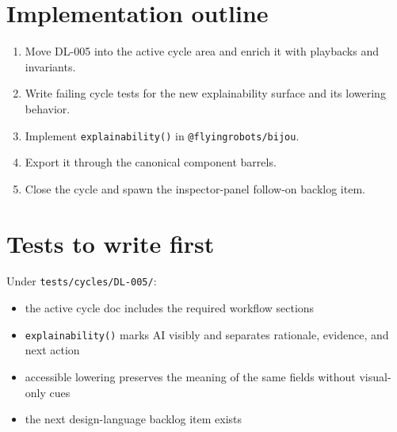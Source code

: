 \section{Implementation outline}\label{record-172-implementation-outline}

\begin{enumerate}
\def\labelenumi{\arabic{enumi}.}
\tightlist
\item
  Move DL-005 into the active cycle area and enrich it with playbacks and invariants.
\item
  Write failing cycle tests for the new explainability surface and its lowering behavior.
\item
  Implement \texttt{e\allowbreak{}x\allowbreak{}p\allowbreak{}l\allowbreak{}a\allowbreak{}i\allowbreak{}n\allowbreak{}a\allowbreak{}b\allowbreak{}i\allowbreak{}l\allowbreak{}i\allowbreak{}t\allowbreak{}y\allowbreak{}(\allowbreak{})} in \texttt{@\allowbreak{}f\allowbreak{}l\allowbreak{}y\allowbreak{}i\allowbreak{}n\allowbreak{}g\allowbreak{}r\allowbreak{}o\allowbreak{}b\allowbreak{}o\allowbreak{}t\allowbreak{}s\allowbreak{}/\allowbreak{}b\allowbreak{}i\allowbreak{}j\allowbreak{}o\allowbreak{}u}.
\item
  Export it through the canonical component barrels.
\item
  Close the cycle and spawn the inspector-panel follow-on backlog item.
\end{enumerate}

\section{Tests to write first}\label{record-172-tests-to-write-first}

Under \texttt{t\allowbreak{}e\allowbreak{}s\allowbreak{}t\allowbreak{}s\allowbreak{}/\allowbreak{}c\allowbreak{}y\allowbreak{}c\allowbreak{}l\allowbreak{}e\allowbreak{}s\allowbreak{}/\allowbreak{}D\allowbreak{}L\allowbreak{}-\allowbreak{}0\allowbreak{}0\allowbreak{}5\allowbreak{}/}:

\begin{itemize}
\tightlist
\item
  the active cycle doc includes the required workflow sections
\item
  \texttt{e\allowbreak{}x\allowbreak{}p\allowbreak{}l\allowbreak{}a\allowbreak{}i\allowbreak{}n\allowbreak{}a\allowbreak{}b\allowbreak{}i\allowbreak{}l\allowbreak{}i\allowbreak{}t\allowbreak{}y\allowbreak{}(\allowbreak{})} marks AI visibly and separates rationale, evidence, and next action
\item
  accessible lowering preserves the meaning of the same fields without visual-only cues
\item
  the next design-language backlog item exists
\end{itemize}

